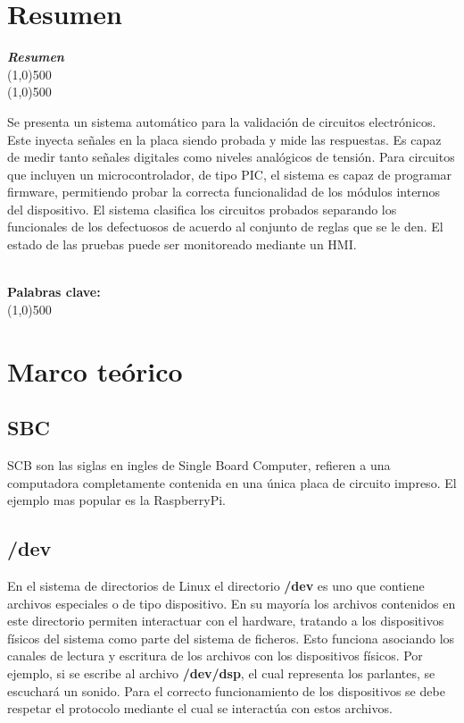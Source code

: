 \documentclass[12pt,letterpaper]{article}     %
\makeatletter
\newcounter{resumen}
\newenvironment{resumen}
{	
	\begin{center}
	\begin{minipage}[t]{500 pt}
	\vspace{5mm}
	\emph{\textbf{Resumen}}
	\\[-2mm]
	\line(1,0){500}
	\\[-4.25 mm]
	\line(1,0){500}
	\vspace{\baselineskip}
}
{
	\normalsize
	\\[2mm]
	\footnotesize\textbf{Palabras clave: \footnotesize\@palabras}
	\\[-2mm]
	\line(1,0){500}
	\\[0.5cm]
	\end{minipage}
	\end{center}
}
\makeatother
\begin{document}
\newpage
\section{Resumen}
\begin{resumen}
	Se presenta un sistema automático para la validación de circuitos electrónicos.
	Este inyecta señales en la placa siendo probada y mide las respuestas.
	Es capaz de medir tanto señales digitales como niveles analógicos de tensión.
	Para circuitos que incluyen un microcontrolador, de tipo PIC, el sistema es capaz de programar
	firmware, permitiendo probar la correcta funcionalidad de los módulos internos
	del dispositivo. El sistema clasifica los circuitos probados separando los
	funcionales de los defectuosos de acuerdo al conjunto de reglas que se le den.
	El estado de las pruebas puede ser monitoreado mediante un HMI.
\end{resumen} 
\clearpage
\section{Marco teórico}
\label{Marco teórico}

\subsection{SBC}

SCB son las siglas en ingles de Single Board Computer, refieren a una computadora completamente contenida en una
única placa de circuito impreso. El ejemplo mas popular es la RaspberryPi.

\subsection{/dev}

En el sistema de directorios de Linux el directorio \textbf{/dev} es uno que contiene archivos especiales 
o de tipo dispositivo. En su mayoría los archivos contenidos en este directorio permiten interactuar con el
hardware, tratando a los dispositivos físicos del sistema como parte del sistema de ficheros. Esto funciona 
asociando los canales de lectura y escritura de los archivos con los dispositivos físicos. Por ejemplo,
si se escribe al archivo \textbf{/dev/dsp}, el cual representa los parlantes, se escuchará un sonido. Para el correcto
funcionamiento de los dispositivos se debe respetar el protocolo mediante el cual se interactúa con estos archivos.
\end{document}
